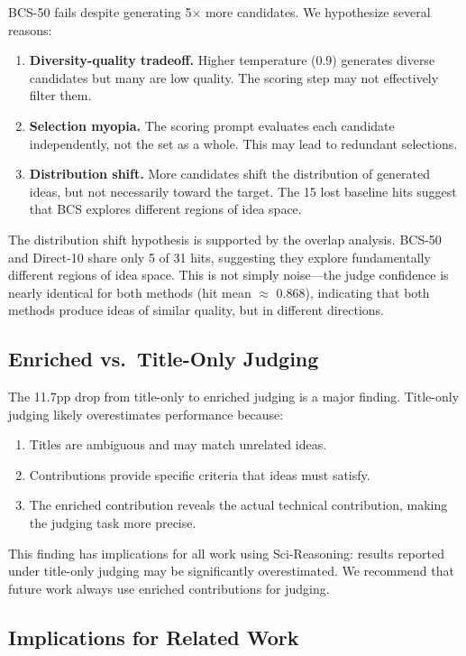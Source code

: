 \documentclass[wcp]{jmlr}
\begin{document}
BCS-50 fails despite generating 5$\times$ more candidates. We hypothesize several reasons:

\begin{enumerate}
\item \textbf{Diversity-quality tradeoff.} Higher temperature (0.9) generates diverse candidates but many are low quality. The scoring step may not effectively filter them.
\item \textbf{Selection myopia.} The scoring prompt evaluates each candidate independently, not the set as a whole. This may lead to redundant selections.
\item \textbf{Distribution shift.} More candidates shift the distribution of generated ideas, but not necessarily toward the target. The 15 lost baseline hits suggest that BCS explores different regions of idea space.
\end{enumerate}

The distribution shift hypothesis is supported by the overlap analysis. BCS-50 and Direct-10 share only 5 of 31 hits, suggesting they explore fundamentally different regions of idea space. This is not simply noise---the judge confidence is nearly identical for both methods (hit mean $\approx$ 0.868), indicating that both methods produce ideas of similar quality, but in different directions.

\subsection{Enriched vs.\ Title-Only Judging}

The 11.7pp drop from title-only to enriched judging is a major finding. Title-only judging likely overestimates performance because:
\begin{enumerate}
\item Titles are ambiguous and may match unrelated ideas.
\item Contributions provide specific criteria that ideas must satisfy.
\item The enriched contribution reveals the actual technical contribution, making the judging task more precise.
\end{enumerate}

This finding has implications for all work using Sci-Reasoning: results reported under title-only judging may be significantly overestimated. We recommend that future work always use enriched contributions for judging.

\subsection{Implications for Related Work}
\end{document}

